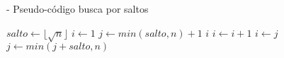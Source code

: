 \begin{algorithm}
    \caption{ - Pseudo-código busca por saltos \cite{shneiderman_jump_1978}}
    \begin{algorithmic}[1]
        \STATE $salto \leftarrow \lfloor \sqrt{n} \rfloor$
        \STATE $i \leftarrow 1$
        \STATE $j \leftarrow min(salto, n) + 1$
                        \RETURN $ i $
                    \ENDIF
                    \STATE $i \leftarrow i + 1$
                \ENDWHILE
                \RETURN \FALSE
            \ENDIF
            \STATE $i \leftarrow j$
            \STATE $j \leftarrow min(j + salto, n)$
        \ENDWHILE
        \RETURN \FALSE
    \end{algorithmic}
    \label{alg:busca_saltos}
\end{algorithm}